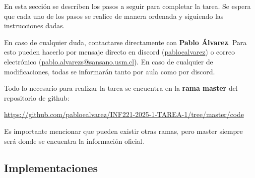 En esta sección se describen los pasos a seguir para completar la tarea. Se espera que cada uno de los pasos se realice de manera ordenada y siguiendo las instrucciones dadas.
\begin{mdframed}
    En caso de cualquier duda, contactarse directamente con \textbf{Pablo Álvarez}. Para esto pueden hacerlo por mensaje directo en discord (\url{pabloealvarez}) o correo electrónico (\url{pablo.alvarezs@sansano.usm.cl}). En caso de cualquier de modificaciones, todas se informarán tanto por aula como por discord.

    Todo lo necesario para realizar la tarea se encuentra en la \textbf{rama master} del repositorio de github:
    \begin{center}
    
        \url{https://github.com/pabloealvarez/INF221-2025-1-TAREA-1/tree/master/code}
            
    \end{center}

    Es importante mencionar que pueden existir otras ramas, pero master siempre será donde se encuentra la información oficial.




\end{mdframed}

\subsection{Implementaciones}



